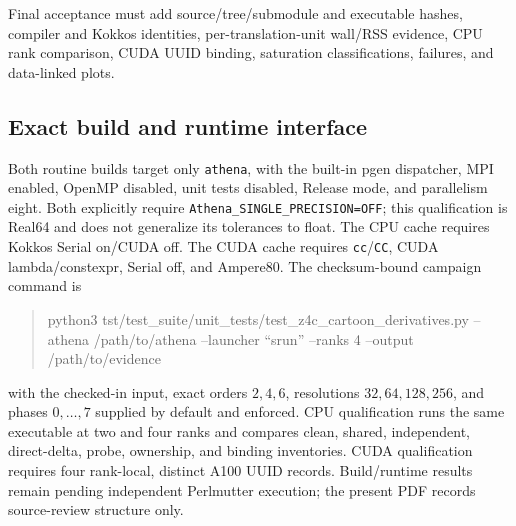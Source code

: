 
Final acceptance must add source/tree/submodule and executable hashes, compiler and
Kokkos identities, per-translation-unit wall/RSS evidence, CPU rank comparison,
CUDA UUID binding, saturation classifications, failures, and data-linked plots.

\subsection{Exact build and runtime interface}
Both routine builds target only \texttt{athena}, with the built-in pgen dispatcher,
MPI enabled, OpenMP disabled, unit tests disabled, Release mode, and parallelism
eight.  Both explicitly require \texttt{Athena\_SINGLE\_PRECISION=OFF}; this
qualification is Real64 and does not generalize its tolerances to float.  The CPU
cache requires Kokkos Serial on/CUDA off.  The CUDA cache requires
\texttt{cc}/\texttt{CC}, CUDA lambda/constexpr, Serial off, and Ampere80.  The
checksum-bound campaign command is
\begin{quote}\ttfamily
python3 tst/test\_suite/unit\_tests/test\_z4c\_cartoon\_derivatives.py
--athena /path/to/athena --launcher ``srun'' --ranks 4
--output /path/to/evidence
\end{quote}
with the checked-in input, exact orders $2,4,6$, resolutions
$32,64,128,256$, and phases $0,\ldots,7$ supplied by default and enforced.  CPU
qualification runs the same executable at two and four ranks and compares clean,
shared, independent, direct-delta, probe, ownership, and binding inventories.  CUDA
qualification requires four rank-local, distinct A100 UUID records.  Build/runtime
results remain pending independent Perlmutter execution; the present PDF records
source-review structure only.

